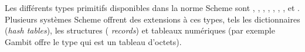 

Les différents types primitifs disponibles dans la norme Scheme sont
, , , ,
, , ,  et
.  Plusieurs systèmes Scheme offrent des extensions à ces
types, tels les dictionnaires ({\it hash tables}), les structures ({\it
records}) et tableaux numériques (par exemple Gambit offre le type
 qui est un tableau d'octets).

